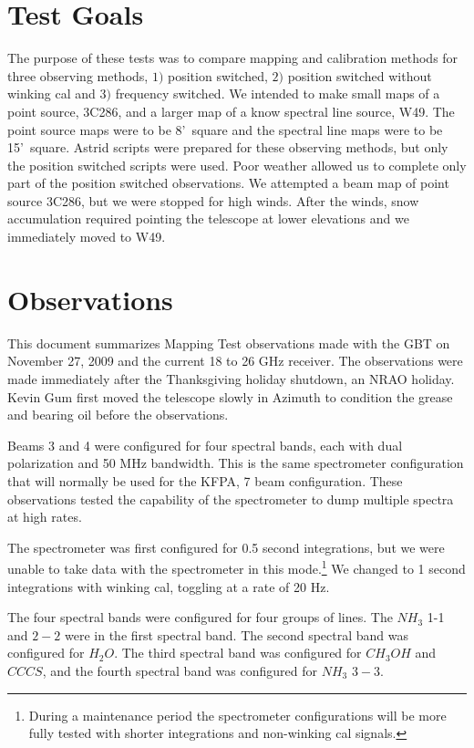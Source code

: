 \documentclass[12pt,twoside]{article}
\newcommand{\arcm}{'~}
\begin{document}
\section{Test Goals}
The purpose of these tests was to compare mapping and calibration methods for
three observing methods, $1)$ position switched,
$2)$ position switched without winking cal and
$3)$ frequency switched.
We intended to make small maps of a point source, 3C286, and a larger map
of a know spectral line source, W49.   The point source maps were to be
8\arcm square and the spectral line maps were to be 15\arcm square.
Astrid scripts were prepared for these observing methods, but only
the position switched scripts were used. 
Poor weather allowed us to complete only part of the position switched observations.
We attempted a beam map of point source 3C286, 
but we were stopped for high winds.   After the winds,
snow accumulation required pointing the telescope
at lower elevations and we immediately moved to W49.

\section{Observations}

This document summarizes Mapping Test observations made with the GBT
on November 27, 2009 and the current 18 to 26 GHz receiver.  
The observations were made immediately after the Thanksgiving
holiday shutdown, an NRAO holiday.   Kevin Gum first moved the
telescope slowly in Azimuth to condition the grease and bearing oil before
the observations.
 
Beams 3 and 4 were configured for four spectral bands, each with dual 
polarization and 50 MHz bandwidth.   This is the same spectrometer configuration
that will normally be used for the KFPA, 7 beam configuration.  
These observations tested the capability of the spectrometer
to dump multiple spectra at high rates.   

The spectrometer was first configured for 0.5 second integrations, but
we were unable to take data with the spectrometer in this mode.\footnote{During a maintenance period the spectrometer configurations will
be more fully tested with shorter integrations and non-winking cal signals.}
We changed to 1 second integrations with winking cal, toggling at a rate of 20 Hz.

The four spectral bands were configured for four groups of lines.
The $NH_3$ 1-1 and $2-2$ were in the first spectral band.
The second spectral band was configured for $H_2O$.   
The third spectral band was configured for $CH_3OH$ and $CCCS$,  and
the fourth spectral band was configured for $NH_3$ $3-3$.
\end{document}
